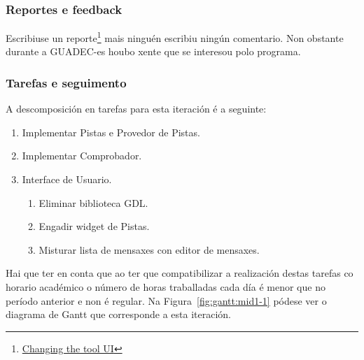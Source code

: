 \subsubsection{Reportes e feedback}
Escribiuse un reporte\footnote{\href{http://aquelando.info/changing-the-tool-ui/}{Changing the tool UI}} mais ninguén escribiu ningún comentario. Non obstante durante a GUADEC-es houbo xente que se interesou polo programa.

\subsubsection{Tarefas e seguimento}

A descomposición en tarefas para esta iteración é a seguinte:

\begin{enumerate}[label=\bfseries WBS 1.\arabic*]
  \item Implementar Pistas e Provedor de Pistas.
  \item Implementar Comprobador.
  \item Interface de Usuario.
    \begin{enumerate}[label=\bfseries WBS 1.3.\arabic*]
      \item Eliminar biblioteca GDL.
      \item Engadir widget de Pistas.
      \item Misturar lista de mensaxes con editor de mensaxes.
    \end{enumerate}
\end{enumerate}

Hai que ter en conta que ao ter que compatibilizar a realización destas tarefas co horario académico o número de horas traballadas cada día é menor que no período anterior e non é regular. Na Figura~\ref{fig:gantt:mid1-1} pódese ver o diagrama de Gantt que corresponde a esta iteración.

